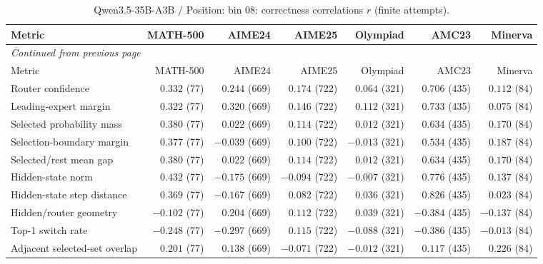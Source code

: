 \begingroup\scriptsize\setlength{\tabcolsep}{4pt}
\begin{longtable}{@{}lrrrrrr@{}}
\caption{Qwen3.5-35B-A3B / Position: bin 08: correctness correlations $r$ (finite attempts).}\label{tab:multi-qwen-position-bin_08}\\
\toprule
Metric & MATH-500 & AIME24 & AIME25 & Olympiad & AMC23 & Minerva \\
\midrule\endfirsthead
\multicolumn{7}{l}{\textit{Continued from previous page}}\\
\toprule
Metric & MATH-500 & AIME24 & AIME25 & Olympiad & AMC23 & Minerva \\
\midrule\endhead
\bottomrule\endfoot
Router confidence & $0.332$ (77) & $0.244$ (669) & $0.174$ (722) & $0.064$ (321) & $0.706$ (435) & $0.112$ (84) \\
Leading-expert margin & $0.322$ (77) & $0.320$ (669) & $0.146$ (722) & $0.112$ (321) & $0.733$ (435) & $0.075$ (84) \\
Selected probability mass & $0.380$ (77) & $0.022$ (669) & $0.114$ (722) & $0.012$ (321) & $0.634$ (435) & $0.170$ (84) \\
Selection-boundary margin & $0.377$ (77) & $-0.039$ (669) & $0.100$ (722) & $-0.013$ (321) & $0.534$ (435) & $0.187$ (84) \\
Selected/rest mean gap & $0.380$ (77) & $0.022$ (669) & $0.114$ (722) & $0.012$ (321) & $0.634$ (435) & $0.170$ (84) \\
Hidden-state norm & $0.432$ (77) & $-0.175$ (669) & $-0.094$ (722) & $-0.007$ (321) & $0.776$ (435) & $0.137$ (84) \\
Hidden-state step distance & $0.369$ (77) & $-0.167$ (669) & $0.082$ (722) & $0.036$ (321) & $0.826$ (435) & $0.023$ (84) \\
Hidden/router geometry & $-0.102$ (77) & $0.204$ (669) & $0.112$ (722) & $0.039$ (321) & $-0.384$ (435) & $-0.137$ (84) \\
Top-1 switch rate & $-0.248$ (77) & $-0.297$ (669) & $0.115$ (722) & $-0.088$ (321) & $-0.386$ (435) & $-0.013$ (84) \\
Adjacent selected-set overlap & $0.201$ (77) & $0.138$ (669) & $-0.071$ (722) & $-0.012$ (321) & $0.117$ (435) & $0.226$ (84) \\
\end{longtable}\endgroup

